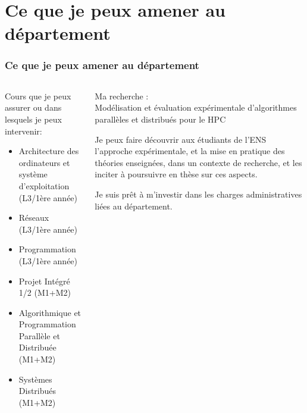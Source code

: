 \documentclass[compress,aspectratio=169]{beamer}
\begin{document}
\section{Ce que je peux amener au d\'epartement}

\begin{frame}
  \frametitle{Ce que je peux amener au d\'epartement}

  \begin{columns}
    \begin{column}{.45\linewidth}
      \small
      Cours que je peux assurer ou dans lesquels je peux intervenir:
      \begin{itemize}
      \item Architecture des ordinateurs et syst\`eme d'exploitation (L3/1\`ere ann\'ee)
      \item R\'eseaux (L3/1\`ere ann\'ee)
      \item Programmation (L3/1\`ere ann\'ee)
      \item Projet Int\'egr\'e 1/2 (M1+M2)
      \item Algorithmique et Programmation Parall\`ele et Distribu\'ee (M1+M2)
      \item Syst\`emes Distribu\'es (M1+M2)
      \end{itemize}
    \end{column}\begin{column}{.45\linewidth}
      \small
      Ma recherche : \\
      Mod\'elisation et \'evaluation exp\'erimentale d'algorithmes parall\`eles et distribu\'es pour le HPC

      \bigskip
      
      Je peux faire d\'ecouvrir aux \'etudiants de l'ENS l'approche exp\'erimentale, et la mise en pratique des th\'eories enseign\'ees, dans un contexte de recherche, et les inciter \`a poursuivre en th\`ese sur ces aspects.

      \bigskip

      Je suis pr\^et \`a m'investir dans les charges administratives li\'ees au d\'epartement.
      
    \end{column}
  \end{columns}
  
\end{frame}
\end{document}
